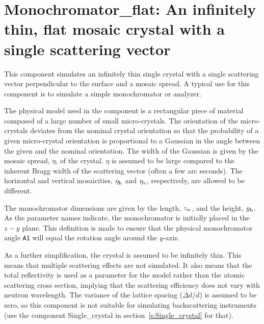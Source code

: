 
\section{Monochromator\_flat: An infinitely thin, flat mosaic crystal with 
a single scattering vector}
\label{s:monochromator_flat}



This component simulates an infinitely thin single
crystal with a single scattering vector perpendicular to the
surface and a mosaic spread. A typical
use for this component is to simulate a simple monochromator or analyzer.

The physical model used in the component is a rectangular piece of
material composed of a large number of small micro-crystals.
The orientation of the
micro-crystals deviates from the nominal crystal orientation so that the
probability of a given micro-crystal orientation is proportional to a
Gaussian in the angle between the given and the nominal orientation. The
width of the Gaussian is given by the mosaic spread, $\eta$, of the crystal. 
$\eta$ is assumed to be large compared to the inherent Bragg width of the
scattering vector (often a few arc seconds).
The horizontal and vertical mosaicities, $\eta_{\rm h}$ and $\eta_{\rm v}$,
respectively, are allowed to be different.

The monochromator dimensions are given by the length, $z_{\rm w}$, and
the height, $y_{\rm h}$. As the parameter names indicate, the 
monochromator is initially placed in the $z-y$ plane. This definition
is made to ensure that the physical monochromator angle \verb+A1+ 
will equal the \MCS rotation angle around the $y$-axis.
 
As a further simplification, the crystal is assumed to be infinitely
thin. This means that multiple scattering effects are not simulated. It
also means that the total reflectivity is used as a parameter for
the model rather than the atomic scattering cross section, implying that
the scattering efficiency does not vary with neutron wavelength.
The variance
of the lattice spacing ($\Delta d/d$) is assumed to be zero, so this
component is not suitable for simulating backscattering instruments (use
the component {\rm Single\_crystal} 
in section~\ref{s:Single_crystal} for that).

